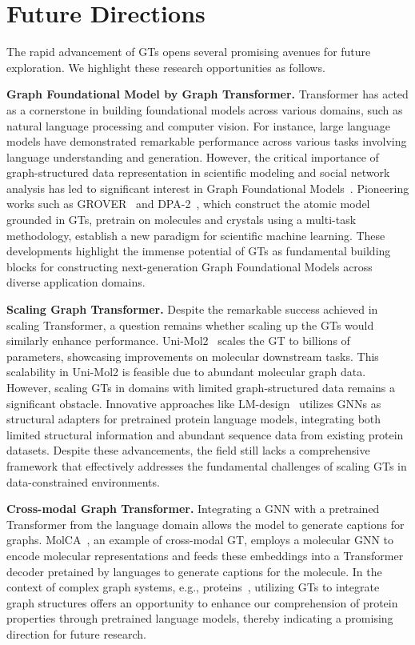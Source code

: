 \section{Future Directions}
\label{sec.future}
The rapid advancement of GTs opens several promising avenues for future exploration. We highlight these research opportunities as follows.


\textbf{Graph Foundational Model by Graph Transformer.} Transformer has acted as a cornerstone in building foundational models across various domains, such as natural language processing and computer vision. For instance, large language models have demonstrated remarkable performance across various tasks involving language understanding and generation. 
However, the critical importance of graph-structured data representation in scientific modeling and social network analysis has led to significant interest in Graph Foundational Models~\cite{mao2024position}. Pioneering works such as GROVER~\cite{rong2020self} and DPA-2~\cite{zhang2023dpa}, which construct the atomic model grounded in GTs, pretrain on molecules and crystals using a multi-task methodology, establish a new paradigm for scientific machine learning. These developments highlight the immense potential of GTs as fundamental building blocks for constructing next-generation Graph Foundational Models across diverse application domains.




\textbf{Scaling Graph Transformer.}
Despite the remarkable success achieved in scaling Transformer, a question remains whether scaling up the GTs would similarly enhance performance. Uni-Mol2~\cite{ji2024exploring} scales the GT to billions of parameters, showcasing improvements on molecular downstream tasks. This scalability in Uni-Mol2 is feasible due to abundant molecular graph data. However, scaling GTs in domains with limited graph-structured data remains a significant obstacle. Innovative approaches like LM-design~\cite{zheng2023structure} utilizes GNNs as structural adapters for pretrained protein language models, integrating both limited structural information and abundant sequence data from existing protein datasets. Despite these advancements, the field still lacks a comprehensive framework that effectively addresses the fundamental challenges of scaling GTs in data-constrained environments.

\textbf{Cross-modal Graph Transformer.} 
Integrating a GNN with a pretrained Transformer from the language domain allows the model to generate captions for graphs. MolCA~\cite{liu2023molca}, an example of cross-modal GT, employs a molecular GNN to encode molecular representations and feeds these embeddings into a Transformer decoder pretained by languages to generate captions for the molecule. 
In the context of complex graph systems, e.g., proteins~\cite{yuan2024functional}, utilizing GTs to integrate graph structures offers an opportunity to enhance our comprehension of protein properties through pretrained language models, thereby indicating a promising direction for future research. 

